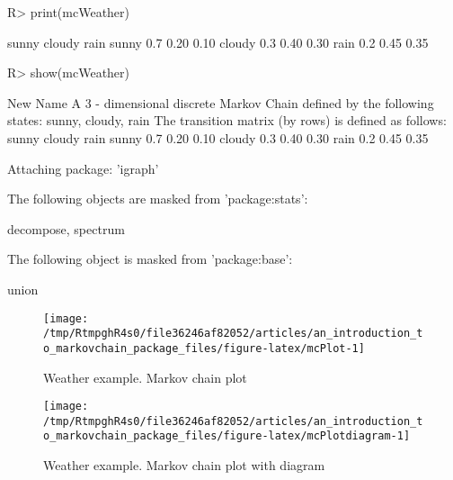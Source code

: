 \documentclass[
  nojss]{jss}
\begin{document}
\begin{CodeChunk}

\begin{CodeInput}
R> print(mcWeather)
\end{CodeInput}

\begin{CodeOutput}
       sunny cloudy rain
sunny    0.7   0.20 0.10
cloudy   0.3   0.40 0.30
rain     0.2   0.45 0.35
\end{CodeOutput}

\begin{CodeInput}
R> show(mcWeather)
\end{CodeInput}

\begin{CodeOutput}
New Name 
 A  3 - dimensional discrete Markov Chain defined by the following states: 
 sunny, cloudy, rain 
 The transition matrix  (by rows)  is defined as follows: 
       sunny cloudy rain
sunny    0.7   0.20 0.10
cloudy   0.3   0.40 0.30
rain     0.2   0.45 0.35
\end{CodeOutput}
\end{CodeChunk}

\begin{CodeChunk}

\begin{CodeOutput}

Attaching package: 'igraph'
\end{CodeOutput}

\begin{CodeOutput}
The following objects are masked from 'package:stats':

    decompose, spectrum
\end{CodeOutput}

\begin{CodeOutput}
The following object is masked from 'package:base':

    union
\end{CodeOutput}
\begin{figure}

{\centering \texttt{[image: /tmp/RtmpghR4s0/file36246af82052/articles/an\_introduction\_to\_markovchain\_package\_files/figure-latex/mcPlot-1]} 

}

\caption[Weather example]{Weather example. Markov chain plot}\label{fig:mcPlot}
\end{figure}
\end{CodeChunk}

\begin{CodeChunk}
\begin{figure}

{\centering \texttt{[image: /tmp/RtmpghR4s0/file36246af82052/articles/an\_introduction\_to\_markovchain\_package\_files/figure-latex/mcPlotdiagram-1]} 

}

\caption[Weather example]{Weather example. Markov chain plot with diagram}\label{fig:mcPlotdiagram}
\end{figure}
\end{CodeChunk}
\end{document}

